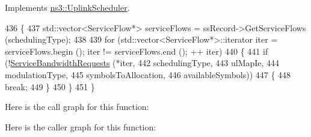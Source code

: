 Implements \hyperlink{classns3_1_1UplinkScheduler_ae6bbcbf3cae55770d0f100692e8af16b}{ns3\+::\+Uplink\+Scheduler}.


\begin{DoxyCode}
436 \{
437   std::vector<ServiceFlow*> serviceFlows = ssRecord->GetServiceFlows (schedulingType);
438 
439   \textcolor{keywordflow}{for} (std::vector<ServiceFlow*>::iterator iter = serviceFlows.begin (); iter != serviceFlows.end (); ++
      iter)
440     \{
441       \textcolor{keywordflow}{if} (!\hyperlink{classns3_1_1UplinkSchedulerRtps_a35d16645e1db685e5df2b5fc7527f5de}{ServiceBandwidthRequests} (*iter,
442                                      schedulingType,
443                                      ulMapIe,
444                                      modulationType,
445                                      symbolsToAllocation,
446                                      availableSymbols))
447         \{
448           \textcolor{keywordflow}{break};
449         \}
450     \}
451 \}
\end{DoxyCode}


Here is the call graph for this function\+:




Here is the caller graph for this function\+:


